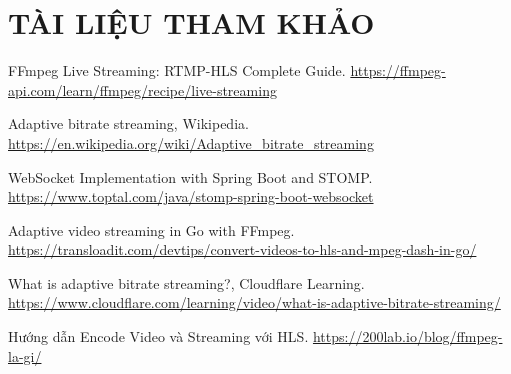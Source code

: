 \clearpage
\section{TÀI LIỆU THAM KHẢO}
\begin{thebibliography}{00}

	FFmpeg Live Streaming: RTMP-HLS Complete Guide.
	\url{https://ffmpeg-api.com/learn/ffmpeg/recipe/live-streaming}

	Adaptive bitrate streaming, Wikipedia.
	\url{https://en.wikipedia.org/wiki/Adaptive_bitrate_streaming}

	WebSocket Implementation with Spring Boot and STOMP.
	\url{https://www.toptal.com/java/stomp-spring-boot-websocket}

	Adaptive video streaming in Go with FFmpeg.
	\url{https://transloadit.com/devtips/convert-videos-to-hls-and-mpeg-dash-in-go/}

	What is adaptive bitrate streaming?, Cloudflare Learning.
	\url{https://www.cloudflare.com/learning/video/what-is-adaptive-bitrate-streaming/}

	Hướng dẫn Encode Video và Streaming với HLS.
	\url{https://200lab.io/blog/ffmpeg-la-gi/}

\end{thebibliography}


